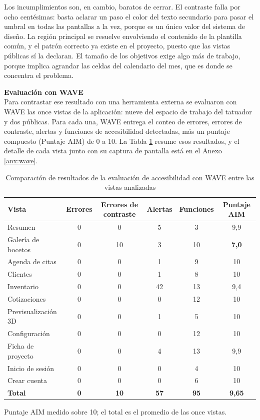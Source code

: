 \documentclass[12pt,letterpaper,oneside]{report}
\newcommand{\tituloparpegado}[1]{\par\textbf{#1}\\\indent\ignorespaces}
\begin{document}
Los incumplimientos son, en cambio, baratos de cerrar. El contraste falla por ocho centésimas: basta aclarar un paso el color del texto secundario para pasar el umbral en todas las pantallas a la vez, porque es un único valor del sistema de diseño. La región principal se resuelve envolviendo el contenido de la plantilla común, y el patrón correcto ya existe en el proyecto, puesto que las vistas públicas sí la declaran. El tamaño de los objetivos exige algo más de trabajo, porque implica agrandar las celdas del calendario del mes, que es donde se concentra el problema.

\vspace{\parskip}
\tituloparpegado{Evaluación con WAVE}
Para contrastar ese resultado con una herramienta externa se evaluaron con WAVE las once vistas de la aplicación: nueve del espacio de trabajo del tatuador y dos públicas. Para cada una, WAVE entrega el conteo de errores, errores de contraste, alertas y funciones de accesibilidad detectadas, más un puntaje compuesto (Puntaje AIM) de 0 a 10. La Tabla \ref{tab:wave} resume esos resultados, y el detalle de cada vista junto con su captura de pantalla está en el Anexo \ref{anx:wave}.

\begin{table}[H]
  \centering
  \caption{Comparación de resultados de la evaluación de accesibilidad con WAVE entre las vistas analizadas}
  \label{tab:wave}
  \renewcommand{\arraystretch}{1.2}
  \footnotesize
  \begin{tabular}{|>{\raggedright\arraybackslash}p{4.2cm}|c|c|c|c|c|}
    \hline
    \textbf{Vista} & \textbf{Errores} & \textbf{Errores de contraste} & \textbf{Alertas} & \textbf{Funciones} & \textbf{Puntaje AIM} \\
    \hline
    Resumen & 0 & 0 & 5 & 3 & 9,9 \\ \hline
    Galería de bocetos & 0 & 10 & 3 & 10 & \textbf{7,0} \\ \hline
    Agenda de citas & 0 & 0 & 1 & 9 & 10 \\ \hline
    Clientes & 0 & 0 & 1 & 8 & 10 \\ \hline
    Inventario & 0 & 0 & 42 & 13 & 9,4 \\ \hline
    Cotizaciones & 0 & 0 & 0 & 12 & 10 \\ \hline
    Previsualización 3D & 0 & 0 & 1 & 5 & 10 \\ \hline
    Configuración & 0 & 0 & 0 & 12 & 10 \\ \hline
    Ficha de proyecto & 0 & 0 & 4 & 13 & 9,9 \\ \hline
    Inicio de sesión & 0 & 0 & 0 & 4 & 10 \\ \hline
    Crear cuenta & 0 & 0 & 0 & 6 & 10 \\ \hline
    \textbf{Total} & \textbf{0} & \textbf{10} & \textbf{57} & \textbf{95} & \textbf{9,65} \\ \hline
  \end{tabular}

  \vspace{2pt}
  {\footnotesize Puntaje AIM medido sobre 10; el total es el promedio de las once vistas.}
\end{table}
\end{document}
